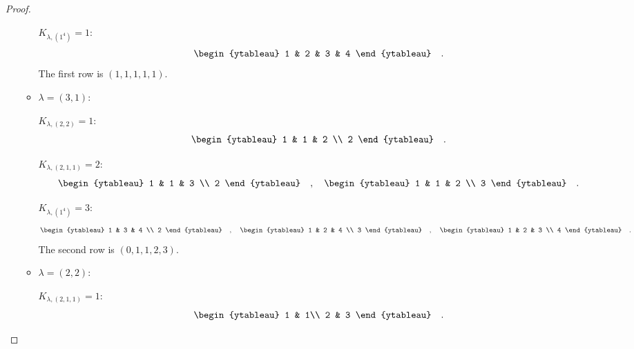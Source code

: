 \documentclass[12pt]{extarticle}
\newcommand{\<}{\langle}
\renewcommand{\>}{\rangle}
\theoremstyle{definition}
\begin{document}
\begin{proof}
\begin{enumerate}
\begin{itemize}
      $K_{\lambda, (1^4)} = 1$:
      \begin{align*}
        \begin{ytableau}
          1 & 2 & 3 & 4 
        \end{ytableau}\quad.
      \end{align*}
      The first row is $(1,1,1,1,1)$.

    \item
      $\lambda=(3,1)$:
      
      $K_{\lambda, (2,2)} = 1$:
      \begin{align*}
        \begin{ytableau}
          1 & 1 & 2 \\
          2
        \end{ytableau}\quad.
      \end{align*}

      $K_{\lambda, (2,1,1)} = 2$:
      \begin{align*}
        \begin{ytableau}
          1 & 1 & 3 \\
          2
        \end{ytableau}\quad,\quad
        \begin{ytableau}
          1 & 1 & 2 \\
          3
        \end{ytableau}\quad.
      \end{align*}

      $K_{\lambda, (1^4)} = 3 $:
      \begin{align*}
        \begin{ytableau}
          1 & 3 & 4 \\
          2
        \end{ytableau}\quad,\quad
        \begin{ytableau}
          1 & 2 & 4 \\
          3
        \end{ytableau}\quad,\quad
        \begin{ytableau}
          1 & 2 & 3 \\
          4
        \end{ytableau}\quad.        
      \end{align*}
      The second row is $(0,1,1,2,3)$.
    \item
      $\lambda=(2,2)$:

      $K_{\lambda, (2,1,1)} = 1$:
      \begin{align*}
        \begin{ytableau}
          1 & 1\\
          2 & 3
        \end{ytableau}\quad.
      \end{align*}


\end{itemize}
\end{enumerate}
\end{proof}
\end{document}
